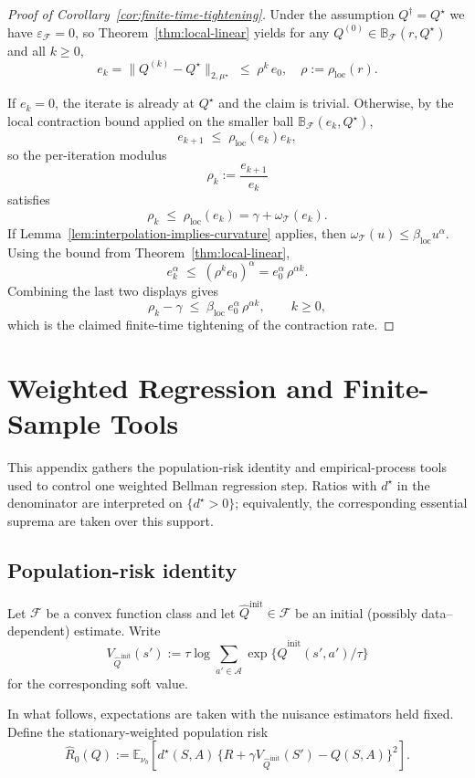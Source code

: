 \documentclass{article}
\newcommand{\loc}{\mathrm{loc}}
\theoremstyle{plain}
\theoremstyle{definition}
\theoremstyle{remark}
\newcommand{\E}{\mathbb{E}}
\begin{document}
\begin{proof}[Proof of Corollary~\ref{cor:finite-time-tightening}]
Under the assumption $Q^\dagger = Q^\star$ we have
$\varepsilon_{\mathcal F} = 0$, so Theorem~\ref{thm:local-linear} yields
for any $Q^{(0)} \in \mathbb B_{\mathcal F}(r, Q^\star)$ and all $k \ge 0$,
\[
e_k
=
\|Q^{(k)} - Q^\star\|_{2,\mu^\star}
\;\le\;
\rho^k\,e_0,
\quad
\rho := \rho_{\mathrm{loc}}(r).
\]

If \(e_k=0\), the iterate is already at \(Q^\star\) and the claim is trivial.
Otherwise, by the local contraction bound applied on the smaller ball
\(\mathbb B_{\mathcal F}(e_k,Q^\star)\),
\[
e_{k+1}
\;\le\;
\rho_{\mathrm{loc}}(e_k)e_k,
\]
so the per-iteration modulus
\[
\rho_k := \frac{e_{k+1}}{e_k}
\]
satisfies
\[
\rho_k
\;\le\;
\rho_{\mathrm{loc}}(e_k)
=\gamma+\omega_{\mathcal T}(e_k).
\]
If Lemma~\ref{lem:interpolation-implies-curvature} applies, then
\(\omega_{\mathcal T}(u)\le\beta_{\loc}u^\alpha\). Using the bound from
Theorem~\ref{thm:local-linear},
\[
e_k^{\alpha}
\;\le\;
(\rho^k e_0)^{\alpha}
=
e_0^{\alpha}\,\rho^{\alpha k}.
\]
Combining the last two displays gives
\[
\rho_k - \gamma
\;\le\;
\beta_{\loc}\,e_0^{\alpha}\,\rho^{\alpha k},
\qquad k \ge 0,
\]
which is the claimed finite-time tightening of the contraction rate.
\end{proof}

\section{Weighted Regression and Finite-Sample Tools}
\label{app:weighted-regression-finite-sample-tools}

This appendix gathers the population-risk identity and empirical-process tools
used to control one weighted Bellman regression step. Ratios with \(d^\star\) in
the denominator are interpreted on \(\{d^\star>0\}\); equivalently, the
corresponding essential suprema are taken over this support.

\subsection{Population-risk identity}
Let $\mathcal F$ be a convex function class and let
$\hat Q^{\mathrm{init}} \in \mathcal F$ be an initial (possibly
data–dependent) estimate.
Write
\[
V_{\hat Q^{\mathrm{init}}}(s')
:=
\tau\log\sum_{a'\in\mathcal A}
\exp\{\hat Q^{\mathrm{init}}(s',a')/\tau\}
\]
for the corresponding soft value.

In what follows, expectations are taken with the nuisance estimators held fixed.
Define the stationary-weighted population risk
\[
\hat R_0(Q)
:=
\E_{\nu_b}\!\left[
  d^\star(S,A)\,
  \bigl\{
    R + \gamma V_{\hat Q^{\mathrm{init}}}(S')
    - Q(S,A)
  \bigr\}^2
\right].
\]
\end{document}
